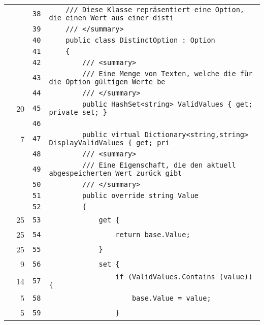 \documentclass[a4paper,10pt]{article}
\begin{document}
\begin{longtable}[l]{lrrl}
\cellcolor{gray} &  & \verb~38~ & \verb~    /// Diese Klasse repräsentiert eine Option, die einen Wert aus einer disti~\\
\cellcolor{gray} &  & \verb~39~ & \verb~    /// </summary>~\\
\cellcolor{gray} &  & \verb~40~ & \verb~    public class DistinctOption : Option~\\
\cellcolor{gray} &  & \verb~41~ & \verb~    {~\\
\cellcolor{gray} &  & \verb~42~ & \verb~        /// <summary>~\\
\cellcolor{gray} &  & \verb~43~ & \verb~        /// Eine Menge von Texten, welche die für die Option gültigen Werte be~\\
\cellcolor{gray} &  & \verb~44~ & \verb~        /// </summary>~\\
\cellcolor{green} & 20 & \verb~45~ & \verb~        public HashSet<string> ValidValues { get; private set; }~\\
\cellcolor{gray} &  & \verb~46~ & \verb~~\\
\cellcolor{green} & 7 & \verb~47~ & \verb~        public virtual Dictionary<string,string> DisplayValidValues { get; pri~\\
\cellcolor{gray} &  & \verb~48~ & \verb~        /// <summary>~\\
\cellcolor{gray} &  & \verb~49~ & \verb~        /// Eine Eigenschaft, die den aktuell abgespeicherten Wert zurück gibt~\\
\cellcolor{gray} &  & \verb~50~ & \verb~        /// </summary>~\\
\cellcolor{gray} &  & \verb~51~ & \verb~        public override string Value~\\
\cellcolor{gray} &  & \verb~52~ & \verb~        {~\\
\cellcolor{green} & 25 & \verb~53~ & \verb~            get {~\\
\cellcolor{green} & 25 & \verb~54~ & \verb~                return base.Value;~\\
\cellcolor{green} & 25 & \verb~55~ & \verb~            }~\\
\cellcolor{green} & 9 & \verb~56~ & \verb~            set {~\\
\cellcolor{green} & 14 & \verb~57~ & \verb~                if (ValidValues.Contains (value)) {~\\
\cellcolor{green} & 5 & \verb~58~ & \verb~                    base.Value = value;~\\
\cellcolor{green} & 5 & \verb~59~ & \verb~                }~\\

\end{longtable}
\end{document}
